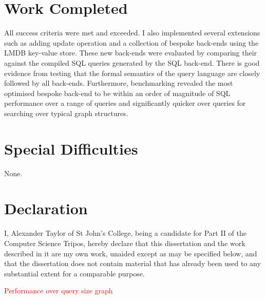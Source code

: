 \documentclass[12pt,a4paper,twoside,openright]{report}
\newcommand\todo[1]{\textcolor{red}{#1}}
\begin{document}
\section*{Work Completed}


All success criteria were met and exceeded. I also implemented several extensions such as adding update operation and a collection of bespoke back-ends using the LMDB key-value store. These new back-ends were evaluated by comparing their against the compiled SQL queries generated by the SQL back-end. There is good evidence from testing that the formal semantics of the query language are closely followed by all back-ends. Furthermore, benchmarking revealed the most optimised bespoke back-end to be within an order of magnitude of SQL performance over a range of queries and significantly quicker over queries for searching over typical graph structures.

\section*{Special Difficulties}

None.
 
\newpage
\section*{Declaration}

I, Alexander Taylor of St John's College, being a candidate for Part II of the Computer
Science Tripos, hereby declare
that this dissertation and the work described in it are my own work,
unaided except as may be specified below, and that the dissertation
does not contain material that has already been used to any substantial
extent for a comparable purpose.

\bigskip
{}

\medskip
{}

\tableofcontents

\listoffigures

\newpage


\pagestyle{headings}

\todo{Performance over query size graph}\\
\end{document}

